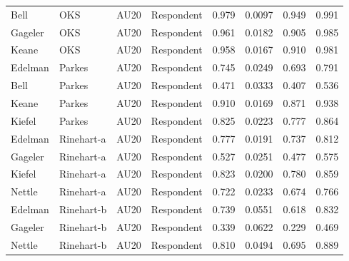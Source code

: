 \documentclass{monashthesis}
\begin{document}
\begin{center}
\begin{longtable}{llllllll}
Bell & OKS & AU20 & Respondent & 0.979 & 0.0097 & 0.949 & 0.991 \\
Gageler & OKS & AU20 & Respondent & 0.961 & 0.0182 & 0.905 & 0.985 \\
Keane & OKS & AU20 & Respondent & 0.958 & 0.0167 & 0.910 & 0.981 \\
Edelman & Parkes & AU20 & Respondent & 0.745 & 0.0249 & 0.693 & 0.791 \\
Bell & Parkes & AU20 & Respondent & 0.471 & 0.0333 & 0.407 & 0.536 \\
Keane & Parkes & AU20 & Respondent & 0.910 & 0.0169 & 0.871 & 0.938 \\
Kiefel & Parkes & AU20 & Respondent & 0.825 & 0.0223 & 0.777 & 0.864 \\
Edelman & Rinehart-a & AU20 & Respondent & 0.777 & 0.0191 & 0.737 & 0.812 \\
Gageler & Rinehart-a & AU20 & Respondent & 0.527 & 0.0251 & 0.477 & 0.575 \\
Kiefel & Rinehart-a & AU20 & Respondent & 0.823 & 0.0200 & 0.780 & 0.859 \\
Nettle & Rinehart-a & AU20 & Respondent & 0.722 & 0.0233 & 0.674 & 0.766 \\
Edelman & Rinehart-b & AU20 & Respondent & 0.739 & 0.0551 & 0.618 & 0.832 \\
Gageler & Rinehart-b & AU20 & Respondent & 0.339 & 0.0622 & 0.229 & 0.469 \\
Nettle & Rinehart-b & AU20 & Respondent & 0.810 & 0.0494 & 0.695 & 0.889 \\
\end{longtable}
\end{center}

\printbibliography[heading=bibintoc]
\end{document}
